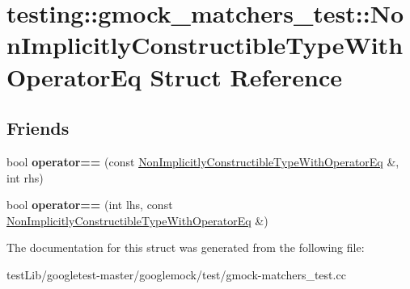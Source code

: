\hypertarget{structtesting_1_1gmock__matchers__test_1_1NonImplicitlyConstructibleTypeWithOperatorEq}{}\section{testing\+:\+:gmock\+\_\+matchers\+\_\+test\+:\+:Non\+Implicitly\+Constructible\+Type\+With\+Operator\+Eq Struct Reference}
\label{structtesting_1_1gmock__matchers__test_1_1NonImplicitlyConstructibleTypeWithOperatorEq}
\subsection*{Friends}
\begin{DoxyCompactItemize}
\item 
\mbox{\label{structtesting_1_1gmock__matchers__test_1_1NonImplicitlyConstructibleTypeWithOperatorEq_a20e9067f1f4becd397742e0db7351d6a}} 
bool {\bfseries operator==} (const \hyperlink{structtesting_1_1gmock__matchers__test_1_1NonImplicitlyConstructibleTypeWithOperatorEq}{Non\+Implicitly\+Constructible\+Type\+With\+Operator\+Eq} \&, int rhs)
\item 
\mbox{\label{structtesting_1_1gmock__matchers__test_1_1NonImplicitlyConstructibleTypeWithOperatorEq_a801c8151d7f7ff24243019980934d143}} 
bool {\bfseries operator==} (int lhs, const \hyperlink{structtesting_1_1gmock__matchers__test_1_1NonImplicitlyConstructibleTypeWithOperatorEq}{Non\+Implicitly\+Constructible\+Type\+With\+Operator\+Eq} \&)
\end{DoxyCompactItemize}


The documentation for this struct was generated from the following file\+:\begin{DoxyCompactItemize}
\item 
test\+Lib/googletest-\/master/googlemock/test/gmock-\/matchers\+\_\+test.\+cc\end{DoxyCompactItemize}
